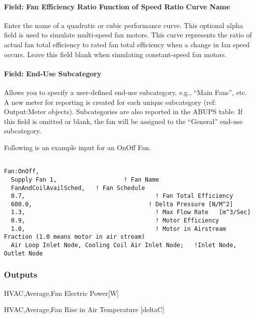 \paragraph{Field: Fan Efficiency Ratio Function of Speed Ratio Curve Name}\label{field-fan-efficiency-ratio-function-of-speed-ratio-curve-name}

Enter the name of a quadratic or cubic performance curve. This optional alpha field is used to simulate multi-speed fan motors. This curve represents the ratio of actual fan total efficiency to rated fan total efficiency when a change in fan speed occurs. Leave this field blank when simulating constant-speed fan motors.

\paragraph{Field: End-Use Subcategory}\label{field-end-use-subcategory-1-000}

Allows you to specify a user-defined end-use subcategory, e.g., ``Main Fans'', etc. A new meter for reporting is created for each unique subcategory (ref: Output:Meter objects). Subcategories are also reported in the ABUPS table. If this field is omitted or blank, the fan will be assigned to the ``General'' end-use subcategory.

Following is an example input for an OnOff Fan.

\begin{lstlisting}

Fan:OnOff,
  Supply Fan 1,                   ! Fan Name
  FanAndCoilAvailSched,   ! Fan Schedule
  0.7,                                     ! Fan Total Efficiency
  600.0,                                 ! Delta Pressure [N/M^2]
  1.3,                                     ! Max Flow Rate   [m^3/Sec]
  0.9,                                     ! Motor Efficiency
  1.0,                                     ! Motor in Airstream Fraction (1.0 means motor in air stream)
  Air Loop Inlet Node, Cooling Coil Air Inlet Node;   !Inlet Node, Outlet Node
\end{lstlisting}

\subsubsection{Outputs}\label{outputs-1-011}

HVAC,Average,Fan Electric Power{[}W{]}

HVAC,Average,Fan Rise in Air Temperature {[}deltaC{]}

